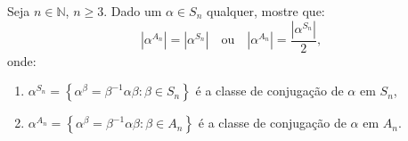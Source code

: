 \begin{exercise}
  Seja $n\in{\mathbb{N}}$, $n\geqslant{3}$. Dado um $\alpha\in{S_{n}}$ qualquer, mostre que:
  \[
    |\alpha^{A_{n}}|=|\alpha^{S_{n}}|
    \quad\text{ou}\quad
    |\alpha^{A_{n}}|=\frac{|\alpha^{S_{n}}|}{2},
  \]
  onde:
  \begin{enumerate}
    \item $\alpha^{S_{n}}=\left\{\alpha^{\beta}=\beta^{-1}\alpha\beta:\beta\in{S_{n}}\right\}$ é a classe de conjugação de $\alpha$ em $S_{n}$,
    \item $\alpha^{A_{n}}=\left\{\alpha^{\beta}=\beta^{-1}\alpha\beta:\beta\in{A_{n}}\right\}$ é a classe de conjugação de $\alpha$ em $A_{n}$.
  \end{enumerate}
\end{exercise}
